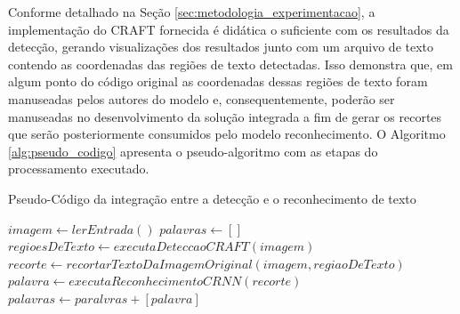 Conforme detalhado na Seção \ref{sec:metodologia_experimentacao}, a implementação do CRAFT fornecida é didática o suficiente com os resultados da detecção, gerando visualizações dos resultados junto com um arquivo de texto contendo as coordenadas das regiões de texto detectadas. Isso demonstra que, em algum ponto do código original as coordenadas dessas regiões de texto foram manuseadas pelos autores do modelo e, consequentemente, poderão ser manuseadas no desenvolvimento da solução integrada a fim de gerar os recortes que serão posteriormente consumidos pelo modelo reconhecimento. O Algoritmo \ref{alg:pseudo_codigo} apresenta o pseudo-algoritmo com as etapas do processamento executado.


\begin{algorithm}
\caption{Pseudo-Código da integração entre a detecção e o reconhecimento de texto}\label{alg:pseudo_codigo}
\begin{algorithmic}
\State $imagem \gets{lerEntrada()}$
\State $palavras \gets{[ ]}$
\State $regioesDeTexto \gets{executaDeteccaoCRAFT(imagem)}$
    \State $recorte \gets{recortarTextoDaImagemOriginal(imagem,regiaoDeTexto)}$
    \State $palavra \gets{executaReconhecimentoCRNN(recorte)}$
    \State $palavras \gets{paralvras + [palavra]}$
\EndFor
\State{}
\end{algorithmic}
\end{algorithm}




